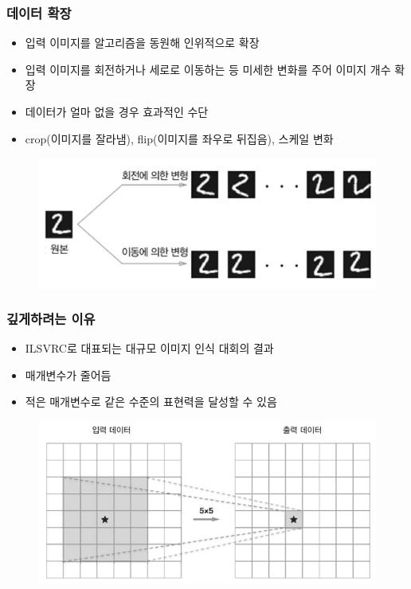 \documentclass{beamer}
\begin{document}
\begin{frame}
	\frametitle{데이터 확장}
	\begin{itemize}
		\item 입력 이미지를 알고리즘을 동원해 인위적으로 확장
		\item 입력 이미지를 회전하거나 세로로 이동하는 등 미세한 변화를 주어 이미지 개수 확장
		\item 데이터가 얼마 없을 경우 효과적인 수단
		\item crop(이미지를 잘라냄), flip(이미지를 좌우로 뒤집음), 스케일 변화
	\end{itemize}
	\begin{figure}
		\includegraphics[width=0.7\columnwidth]{Fig_deep/Figure_4.pdf}
	\end{figure}
\end{frame}

\begin{frame}
	\frametitle{깊게하려는 이유}
	\begin{itemize}
		\item ILSVRC로 대표되는 대규모 이미지 인식 대회의 결과
		\item 매개변수가 줄어듬
		\item 적은 매개변수로 같은 수준의 표현력을 달성할 수 있음
	\end{itemize}
	\begin{figure}
		\includegraphics[width=1\columnwidth]{Fig_deep/Figure_5.pdf}
	\end{figure}
\end{frame}
\end{document}
